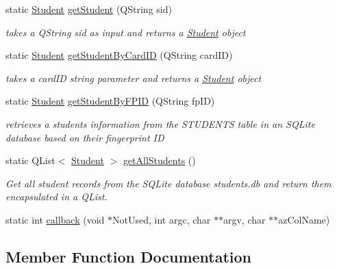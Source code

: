 \begin{DoxyCompactItemize}
static \hyperlink{struct_student}{Student} \hyperlink{class_student_d_b_af18e20bdf62fa2408a22876f9590ffd5}{get\+Student} (Q\+String sid)
\begin{DoxyCompactList}\small\item\em takes a Q\+String sid as input and returns a \hyperlink{struct_student}{Student} object \end{DoxyCompactList}\item 
static \hyperlink{struct_student}{Student} \hyperlink{class_student_d_b_aec7543fe050aac224e1d50ee16aeeb82}{get\+Student\+By\+Card\+I\+D} (Q\+String card\+I\+D)
\begin{DoxyCompactList}\small\item\em takes a card\+I\+D string parameter and returns a \hyperlink{struct_student}{Student} object \end{DoxyCompactList}\item 
static \hyperlink{struct_student}{Student} \hyperlink{class_student_d_b_a4bb67084428edf4f6cfb91643daaa693}{get\+Student\+By\+F\+P\+I\+D} (Q\+String fp\+I\+D)
\begin{DoxyCompactList}\small\item\em retrieves a student\textquotesingle{}s information from the S\+T\+U\+D\+E\+N\+T\+S table in an S\+Q\+Lite database based on their fingerprint I\+D \end{DoxyCompactList}\item 
static Q\+List$<$ \hyperlink{struct_student}{Student} $>$ \hyperlink{class_student_d_b_a92d37eccdeabd6de04972d36caedccc9}{get\+All\+Students} ()
\begin{DoxyCompactList}\small\item\em Get all student records from the S\+Q\+Lite database students.\+db and return them encapsulated in a Q\+List. \end{DoxyCompactList}\item 
static int \hyperlink{class_student_d_b_a6dc7d9b44dbf72262416d9708df1d277}{callback} (void $\ast$Not\+Used, int argc, char $\ast$$\ast$argv, char $\ast$$\ast$az\+Col\+Name)
\end{DoxyCompactItemize}


\subsection{Member Function Documentation}
\hypertarget{class_student_d_b_a6dc7d9b44dbf72262416d9708df1d277}{}
